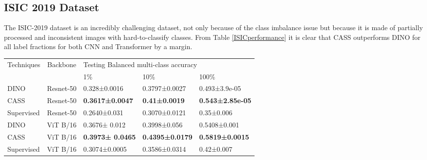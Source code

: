 \subsection {ISIC 2019 Dataset}

The ISIC-2019 dataset is an incredibly challenging dataset, not only because of the class imbalance issue but because it is made of partially processed and inconsistent images with hard-to-classify classes. From Table \ref{ISICperformance} it is clear that CASS outperforms DINO for all label fractions for both CNN and Transformer by a margin.
\begin{table*}[t]
\centering
\begin{tabular}{lllll}
\hline
\multicolumn{1}{c}{\multirow{2}{*}{Techniques}} & \multicolumn{1}{c}{\multirow{2}{*}{Backbone}} & \multicolumn{3}{l}{Testing Balanced multi-class accuracy} \\
\multicolumn{1}{c}{}                            & \multicolumn{1}{c}{}                           & 1\%       & 10\%       & 100\%       \\
\hline
DINO                                            & Resnet-50                                      &0.328±0.0016         &0.3797±0.0027            &0.493±3.9e-05            \\
CASS                                           & Resnet-50                                      &\textbf{0.3617±0.0047}            &\textbf{0.41±0.0019}            &  \textbf{0.543±2.85e-05}           \\
Supervised                                      & Resnet-50                                      &0.2640±0.031           &0.3070±0.0121            &0.35±0.006           \\ 
\hline
DINO                                            & ViT B/16                                           & 0.3676± 0.012           &0.3998±0.056          &0.5408±0.001            \\
CASS                                           & ViT B/16                                           &\textbf{0.3973± 0.0465}           &\textbf{0.4395±0.0179}            &  \textbf{0.5819±0.0015}          \\
Supervised                                      & ViT B/16                                           &0.3074±0.0005           & 0.3586±0.0314           &  0.42±0.007  \\
\hline
\end{tabular}

\caption{Results for the ISIC-2019  dataset. Comparable to the official metrics used in the challenge \url{https://challenge.isic-archive.com/landing/2019/}. We use balanced multi-class accuracy as our metric, which is semantically equal to recall value. We observed that CASS consistently outperforms DINO by approximately 4\% for all label fractions with CNN and Transformer.}
\label{ISICperformance}
\end{table*}

